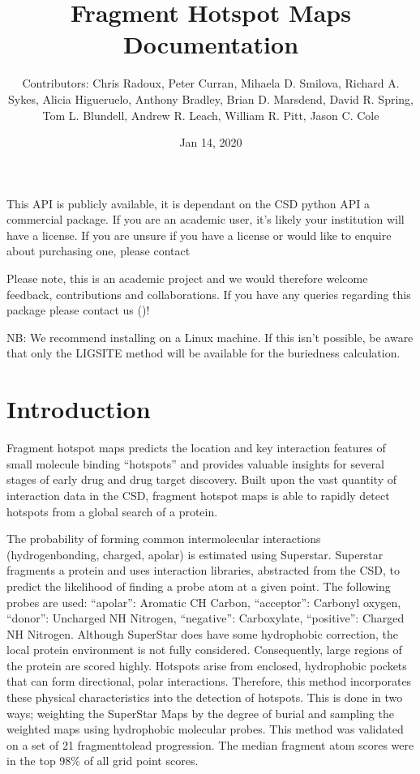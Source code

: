\documentclass[letterpaper,10pt,english]{sphinxmanual}
\title{Fragment Hotspot Maps Documentation}
\date{Jan 14, 2020}
\author{Contributors: Chris Radoux, Peter Curran, Mihaela D. Smilova, Richard A. Sykes, Alicia Higueruelo, Anthony Bradley, Brian D. Marsdend, David R. Spring, Tom L. Blundell, Andrew R. Leach, William R. Pitt, Jason C. Cole}
\begin{document}
\pagestyle{empty}
\sphinxmaketitle
\pagestyle{plain}
\sphinxtableofcontents
\pagestyle{normal}
\label{\detokenize{index::doc}}


\noindent{}

This API is publicly available, it is dependant on the CSD python API \sphinxhyphen{} a commercial package.
If you are an academic user, it’s likely your institution will have a license. If you are unsure if you have a
license or would like to enquire about purchasing one, please contact 

Please note, this is an academic project and we would therefore welcome feedback, contributions and collaborations.
If you have any queries regarding this package please contact us ()!

NB: We recommend installing on a Linux machine. If this isn’t possible, be aware that only the LIGSITE method will be
available for the buriedness calculation.


\chapter{Introduction}
\label{\detokenize{tutorial:introduction}}\label{\detokenize{tutorial::doc}}
Fragment hotspot maps predicts the location and key interaction features of small molecule binding “hotspots” and
provides valuable insights for several stages of early drug and drug target discovery. Built upon the vast quantity of
interaction data in the CSD, fragment hotspot maps is able to rapidly detect hotspots from a global search of a
protein.

The probability of forming common intermolecular interactions (hydrogen\sphinxhyphen{}bonding, charged, apolar) is estimated using
Superstar. Superstar fragments a protein and uses interaction libraries, abstracted from the CSD, to predict the
likelihood of finding a probe atom at a given point. The following probes are used: “apolar”: Aromatic CH Carbon,
“acceptor”: Carbonyl oxygen, “donor”: Uncharged NH Nitrogen, “negative”: Carboxylate, “positive”: Charged NH Nitrogen.
Although SuperStar does have some hydrophobic correction, the local protein environment is not fully considered.
Consequently, large regions of the protein are scored highly. Hotspots arise from enclosed,
hydrophobic pockets that can form directional, polar interactions. Therefore, this method incorporates these physical
characteristics into the detection of hotspots. This is done in two ways; weighting the SuperStar Maps by the degree of
burial and sampling the weighted maps using hydrophobic molecular probes. This method was validated on a set of 21
fragment\sphinxhyphen{}to\sphinxhyphen{}lead progression. The median fragment atom scores were in the top 98\% of all grid point scores.
\end{document}
